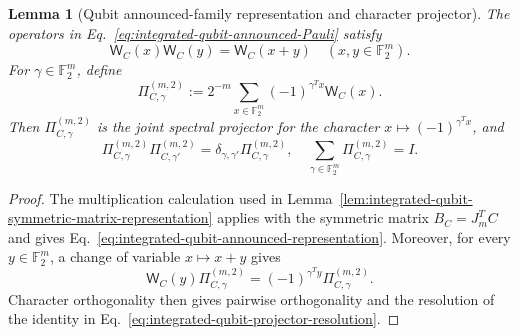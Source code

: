 \documentclass[11pt]{article}
\newcommand{\F}{\mathbb F}
\newcommand{\1}{\mathbf 1}
\theoremstyle{plain}
\newtheorem{lemma}[theorem]{Lemma}
\theoremstyle{definition}
\theoremstyle{remark}
\begin{document}
\begin{lemma}[Qubit announced-family representation and character projector]
\label{lem:integrated-qubit-announced-representation}
The operators in Eq.~\eqref{eq:integrated-qubit-announced-Pauli} satisfy
\begin{equation}
 \mathsf W_C(x)\mathsf W_C(y)=\mathsf W_C(x+y)
 \quad(x,y\in\F_2^m).
 \label{eq:integrated-qubit-announced-representation}
\end{equation}
For $\gamma\in\F_2^m$, define
\begin{equation}
 \Pi_{C,\gamma}^{(m,2)}
 :=2^{-m}\sum_{x\in\F_2^m}(-1)^{\gamma^Tx}\mathsf W_C(x).
 \label{eq:integrated-qubit-accept-projector}
\end{equation}
Then $\Pi_{C,\gamma}^{(m,2)}$ is the joint spectral projector for the
character $x\mapsto(-1)^{\gamma^Tx}$, and
\begin{equation}
 \Pi_{C,\gamma}^{(m,2)}\Pi_{C,\gamma'}^{(m,2)}
 =\delta_{\gamma,\gamma'}\Pi_{C,\gamma}^{(m,2)},
 \quad
 \sum_{\gamma\in\F_2^m}\Pi_{C,\gamma}^{(m,2)}=I.
 \label{eq:integrated-qubit-projector-resolution}
\end{equation}
\end{lemma}
\begin{proof}
The multiplication calculation used in
Lemma~\ref{lem:integrated-qubit-symmetric-matrix-representation} applies with the
symmetric matrix $B_C=J_m^TC$ and gives
Eq.~\eqref{eq:integrated-qubit-announced-representation}.  Moreover, for every
$y\in\F_2^m$, a change of variable $x\mapsto x+y$ gives
\begin{equation}
 \mathsf W_C(y)\Pi_{C,\gamma}^{(m,2)}
 =(-1)^{\gamma^Ty}\Pi_{C,\gamma}^{(m,2)}.
 \label{eq:integrated-qubit-projector-character-action}
\end{equation}
Character orthogonality then gives pairwise orthogonality and the resolution
of the identity in Eq.~\eqref{eq:integrated-qubit-projector-resolution}.
\end{proof}
\end{document}
